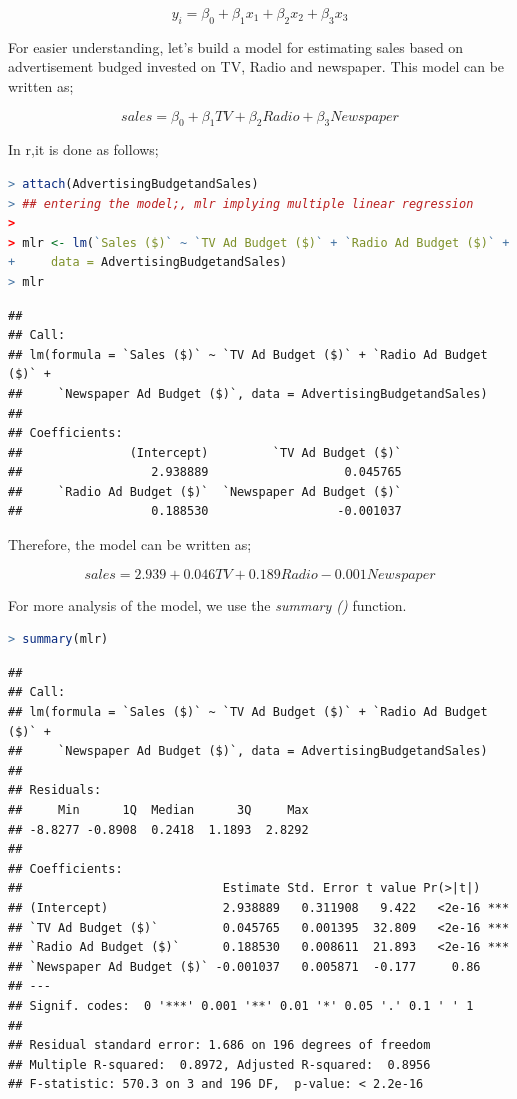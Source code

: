 \documentclass[
]{article}
\begin{document}
\[y_i=\beta_0+\beta_1x_1+\beta_2x_2+\beta_3x_3\]

For easier understanding, let's build a model for estimating sales based
on advertisement budged invested on TV, Radio and newspaper. This model
can be written as;

\[sales=\beta_0 +\beta_1TV+\beta_2Radio+\beta_3Newspaper\]

In r,it is done as follows;

\begin{lstlisting}[language=R]
> attach(AdvertisingBudgetandSales)
> ## entering the model;, mlr implying multiple linear regression
> 
> mlr <- lm(`Sales ($)` ~ `TV Ad Budget ($)` + `Radio Ad Budget ($)` + `Newspaper Ad Budget ($)`,
+     data = AdvertisingBudgetandSales)
> mlr
\end{lstlisting}

\begin{lstlisting}
## 
## Call:
## lm(formula = `Sales ($)` ~ `TV Ad Budget ($)` + `Radio Ad Budget ($)` + 
##     `Newspaper Ad Budget ($)`, data = AdvertisingBudgetandSales)
## 
## Coefficients:
##               (Intercept)         `TV Ad Budget ($)`  
##                  2.938889                   0.045765  
##     `Radio Ad Budget ($)`  `Newspaper Ad Budget ($)`  
##                  0.188530                  -0.001037
\end{lstlisting}

Therefore, the model can be written as;

\[sales=2.939+0.046TV+0.189Radio-0.001Newspaper\]

For more analysis of the model, we use the \emph{summary ()} function.

\begin{lstlisting}[language=R]
> summary(mlr)
\end{lstlisting}

\begin{lstlisting}
## 
## Call:
## lm(formula = `Sales ($)` ~ `TV Ad Budget ($)` + `Radio Ad Budget ($)` + 
##     `Newspaper Ad Budget ($)`, data = AdvertisingBudgetandSales)
## 
## Residuals:
##     Min      1Q  Median      3Q     Max 
## -8.8277 -0.8908  0.2418  1.1893  2.8292 
## 
## Coefficients:
##                            Estimate Std. Error t value Pr(>|t|)    
## (Intercept)                2.938889   0.311908   9.422   <2e-16 ***
## `TV Ad Budget ($)`         0.045765   0.001395  32.809   <2e-16 ***
## `Radio Ad Budget ($)`      0.188530   0.008611  21.893   <2e-16 ***
## `Newspaper Ad Budget ($)` -0.001037   0.005871  -0.177     0.86    
## ---
## Signif. codes:  0 '***' 0.001 '**' 0.01 '*' 0.05 '.' 0.1 ' ' 1
## 
## Residual standard error: 1.686 on 196 degrees of freedom
## Multiple R-squared:  0.8972, Adjusted R-squared:  0.8956 
## F-statistic: 570.3 on 3 and 196 DF,  p-value: < 2.2e-16
\end{lstlisting}
\end{document}
